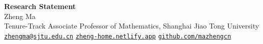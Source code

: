 \documentclass[12pt, a4paper]{article}
\begin{document}
\begin{center}
  {\LARGE\bfseries Research Statement}\\[0.8em]
  {\large Zheng Ma}\\[0.3em]
  {\normalsize
    Tenure-Track Associate Professor of Mathematics,
  Shanghai Jiao Tong University}\\[0.25em]
  {\normalsize
    \href{mailto:zhengma@sjtu.edu.cn}{\texttt{zhengma@sjtu.edu.cn}}
    \enspace\textbar\enspace
    \href{https://zheng-home.netlify.app}{\texttt{zheng-home.netlify.app}}
    \enspace\textbar\enspace
    \href{https://github.com/mazhengcn}{\texttt{github.com/mazhengcn}}
  }
\end{center}
\bigskip








\vfill
\printbibliography[title={Selected References}]
\end{document}
